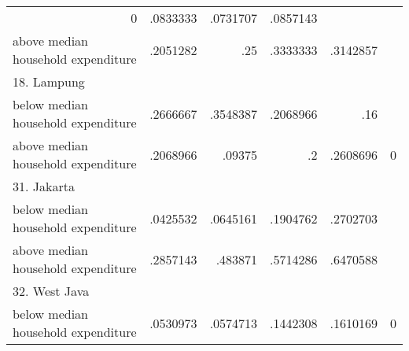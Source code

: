 \begin{table}[!h]
\begin{tabular}{llllll}
  \multicolumn{1}{|r}{0} &
  \multicolumn{1}{r}{.0833333} &
  \multicolumn{1}{r}{.0731707} &
  \multicolumn{1}{r}{.0857143} &
  \multicolumn{1}{r}{} \\
\multicolumn{1}{l}{\hspace{1em}above median household expenditure} &
  \multicolumn{1}{|r}{.2051282} &
  \multicolumn{1}{r}{.25} &
  \multicolumn{1}{r}{.3333333} &
  \multicolumn{1}{r}{.3142857} &
  \multicolumn{1}{r}{} \\
\multicolumn{1}{l}{18. Lampung} &
  \multicolumn{1}{|r}{} &
  \multicolumn{1}{r}{} &
  \multicolumn{1}{r}{} &
  \multicolumn{1}{r}{} &
  \multicolumn{1}{r}{} \\
\multicolumn{1}{l}{\hspace{1em}below median household expenditure} &
  \multicolumn{1}{|r}{.2666667} &
  \multicolumn{1}{r}{.3548387} &
  \multicolumn{1}{r}{.2068966} &
  \multicolumn{1}{r}{.16} &
  \multicolumn{1}{r}{} \\
\multicolumn{1}{l}{\hspace{1em}above median household expenditure} &
  \multicolumn{1}{|r}{.2068966} &
  \multicolumn{1}{r}{.09375} &
  \multicolumn{1}{r}{.2} &
  \multicolumn{1}{r}{.2608696} &
  \multicolumn{1}{r}{0} \\
\multicolumn{1}{l}{31. Jakarta} &
  \multicolumn{1}{|r}{} &
  \multicolumn{1}{r}{} &
  \multicolumn{1}{r}{} &
  \multicolumn{1}{r}{} &
  \multicolumn{1}{r}{} \\
\multicolumn{1}{l}{\hspace{1em}below median household expenditure} &
  \multicolumn{1}{|r}{.0425532} &
  \multicolumn{1}{r}{.0645161} &
  \multicolumn{1}{r}{.1904762} &
  \multicolumn{1}{r}{.2702703} &
  \multicolumn{1}{r}{} \\
\multicolumn{1}{l}{\hspace{1em}above median household expenditure} &
  \multicolumn{1}{|r}{.2857143} &
  \multicolumn{1}{r}{.483871} &
  \multicolumn{1}{r}{.5714286} &
  \multicolumn{1}{r}{.6470588} &
  \multicolumn{1}{r}{} \\
\multicolumn{1}{l}{32. West Java} &
  \multicolumn{1}{|r}{} &
  \multicolumn{1}{r}{} &
  \multicolumn{1}{r}{} &
  \multicolumn{1}{r}{} &
  \multicolumn{1}{r}{} \\
\multicolumn{1}{l}{\hspace{1em}below median household expenditure} &
  \multicolumn{1}{|r}{.0530973} &
  \multicolumn{1}{r}{.0574713} &
  \multicolumn{1}{r}{.1442308} &
  \multicolumn{1}{r}{.1610169} &
  \multicolumn{1}{r}{0} \\

\end{tabular}
\end{table}
